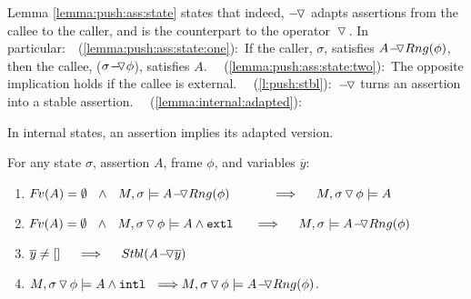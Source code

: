Lemma \ref{lemma:push:ass:state}  states that %
indeed, $\pushSymbolInText$ adapts assertions from the callee to the caller, and is the counterpart to the %
operator $\pushSymbol$.
In particular:\ \ 
 (\ref{lemma:push:ass:state:one}):\ If the caller,   $\sigma$,  satisfies  $\PushASLong  {Rng(\phi)} {A}$, then  the callee,   ($\PushASLong {\phi} {\sigma}$), satisfies $A$.
\ \ (\ref{lemma:push:ass:state:two}):\ The opposite implication holds if the callee is external.
\ \ (\ref{l:push:stbl}):\    $\pushSymbolInText$ turns an assertion into a stable assertion.
\ \ (\ref{lemma:internal:adapted}): \ {In internal states, an assertion implies its adapted version. %
  

\begin{lemma} 
\label{lemma:push:ass:state}
For  any  state  $\sigma$, assertion $A$,   %
frame $\phi$, and variables $\overline y$: %


\begin{enumerate}
 \item
 \label{lemma:push:ass:state:one}
$\fv(A)=\emptyset \ \ \wedge \ \  M, \sigma \models \PushASLong  {Rng(\phi)} {A}\ \  \ \ \ \ \  \ \ \    \Longrightarrow  \ \ \ \ M,  \PushSLong {\phi} {\sigma}   \models A$
\item
 \label{lemma:push:ass:state:two}
$\fv(A)=\emptyset \ \ \wedge \ \ M,  \PushSLong {\phi} {\sigma}   \models  A  \wedge \extThis    \ \  \ \ \    \Longrightarrow  \ \ \ \ M, \sigma \models \PushASLong  {Rng(\phi)} {A}$
\item
\label{l:push:stbl}
$\overline y\neq [] \ \ \ \ \Longrightarrow \ \ \ \ \Stable{ \PushAS y A}$
\item
\label{lemma:internal:adapted}
$M, \PushSLong {\phi} {\sigma}  \models A \wedge \intThis \ \ \Longrightarrow M, \PushSLong {\phi} {\sigma}  \models  \PushASLong {Rng(\phi)} {A}$.
\end{enumerate}
\end{lemma}
}




